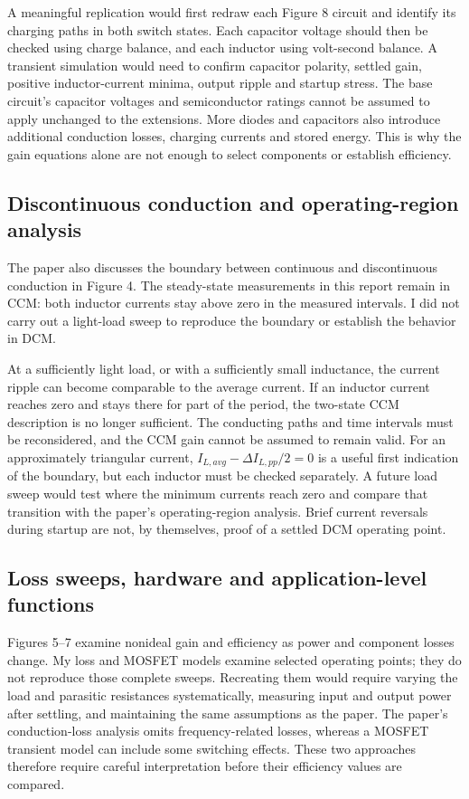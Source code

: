 \documentclass[11pt,a4paper]{article}
\begin{document}
A meaningful replication would first redraw each Figure 8 circuit and identify its charging paths in both switch states. Each capacitor voltage should then be checked using charge balance, and each inductor using volt-second balance. A transient simulation would need to confirm capacitor polarity, settled gain, positive inductor-current minima, output ripple and startup stress. The base circuit's capacitor voltages and semiconductor ratings cannot be assumed to apply unchanged to the extensions. More diodes and capacitors also introduce additional conduction losses, charging currents and stored energy. This is why the gain equations alone are not enough to select components or establish efficiency.

\subsection{Discontinuous conduction and operating-region analysis}
The paper also discusses the boundary between continuous and discontinuous conduction in Figure 4. The steady-state measurements in this report remain in CCM: both inductor currents stay above zero in the measured intervals. I did not carry out a light-load sweep to reproduce the boundary or establish the behavior in DCM.

At a sufficiently light load, or with a sufficiently small inductance, the current ripple can become comparable to the average current. If an inductor current reaches zero and stays there for part of the period, the two-state CCM description is no longer sufficient. The conducting paths and time intervals must be reconsidered, and the CCM gain cannot be assumed to remain valid. For an approximately triangular current, $I_{L,avg}-\Delta I_{L,pp}/2=0$ is a useful first indication of the boundary, but each inductor must be checked separately. A future load sweep would test where the minimum currents reach zero and compare that transition with the paper's operating-region analysis. Brief current reversals during startup are not, by themselves, proof of a settled DCM operating point.

\subsection{Loss sweeps, hardware and application-level functions}
Figures 5--7 examine nonideal gain and efficiency as power and component losses change. My loss and MOSFET models examine selected operating points; they do not reproduce those complete sweeps. Recreating them would require varying the load and parasitic resistances systematically, measuring input and output power after settling, and maintaining the same assumptions as the paper. The paper's conduction-loss analysis omits frequency-related losses, whereas a MOSFET transient model can include some switching effects. These two approaches therefore require careful interpretation before their efficiency values are compared.
\end{document}
